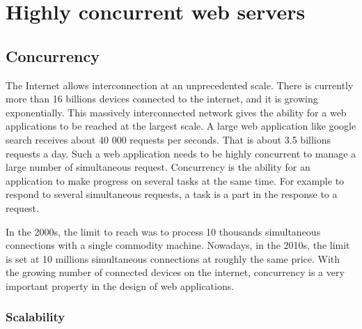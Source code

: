 \section{Highly concurrent web servers}


\subsection{Concurrency}

The Internet allows interconnection at an unprecedented scale.
There is currently more than 16 billions devices connected to the internet, and it is growing exponentially.
This massively interconnected network gives the ability for a web applications to be reached at the largest scale.
A large web application like google search receives about 40 000 requests per seconds.
That is about 3.5 billions requests a day.
Such a web application needs to be highly concurrent to manage a large number of simultaneous request.
Concurrency is the ability for an application to make progress on several tasks at the same time.
For example to respond to several simultaneous requests, a task is a part in the response to a request. 

In the 2000s, the limit to reach was to process 10 thousands simultaneous connections with a single commodity machine.
Nowadays, in the 2010s, the limit is set at 10 millions simultaneous connections at roughly the same price.
With the growing number of connected devices on the internet, concurrency is a very important property in the design of web applications.

\subsubsection{Scalability}

